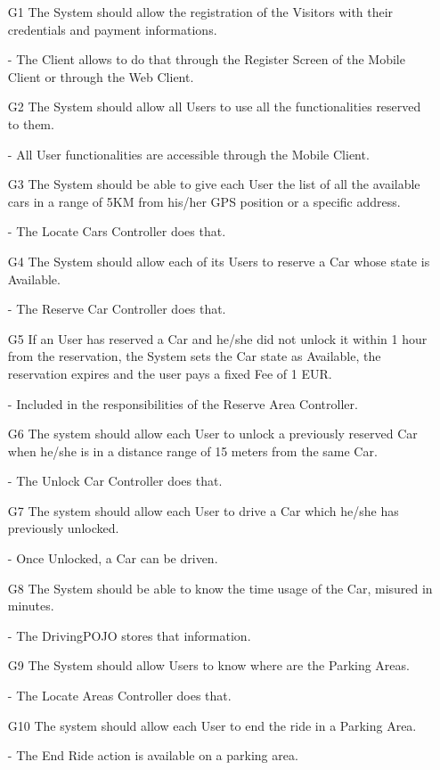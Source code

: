 \documentclass[12pt]{article}
\begin{document}
\begin{enumerate}
	\item[G1] The System should allow the registration of the Visitors with their credentials and payment informations.
	\item[-] The Client allows to do that through the Register Screen of the Mobile Client or through the Web Client.
	\item[G2] The System should allow all Users to use all the functionalities reserved to them.
	\item[-] All User functionalities are accessible through the Mobile Client.
	\item[G3] The System should be able to give each User the list of all the available cars in a range of 5KM from his/her GPS position or a specific address.
	\item[-] The Locate Cars Controller does that.
	\item[G4] The System should allow each of its Users to reserve a Car whose state is Available.
	\item[-] The Reserve Car Controller does that.
	\item[G5] If an User has reserved a Car and he/she did not unlock it within 1 hour from the reservation, the System sets the Car state as Available, the reservation expires and the user pays a fixed Fee of 1 EUR.
	\item[-] Included in the responsibilities of the Reserve Area Controller.
	\item[G6] The system should allow each User to unlock a previously reserved Car when he/she is in a distance range of 15 meters from the same Car.
	\item[-] The Unlock Car Controller does that.
	\item[G7] The system should allow each User to drive a Car which he/she has previously unlocked.
	\item[-] Once Unlocked, a Car can be driven.
	\item[G8] The System should be able to know the time usage of the Car, misured in minutes.
	\item[-] The DrivingPOJO stores that information.
	\item[G9] The System should allow Users to know where are the Parking Areas.
	\item[-] The Locate Areas Controller does that.
	\item[G10] The system should allow each User to end the ride in a Parking Area.
	\item[-] The End Ride action is available on a parking area.

\end{enumerate}
\end{document}
